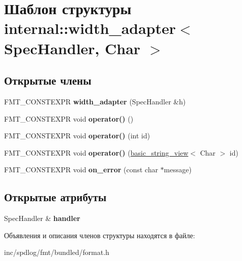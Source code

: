 \hypertarget{structinternal_1_1width__adapter}{}\section{Шаблон структуры internal\+:\+:width\+\_\+adapter$<$ Spec\+Handler, Char $>$}
\label{structinternal_1_1width__adapter}
\subsection*{Открытые члены}
\begin{DoxyCompactItemize}
\item 
\mbox{\label{structinternal_1_1width__adapter_affad3de03545cec8aafc5f21f0f3c893}} 
F\+M\+T\+\_\+\+C\+O\+N\+S\+T\+E\+X\+PR {\bfseries width\+\_\+adapter} (Spec\+Handler \&h)
\item 
\mbox{\label{structinternal_1_1width__adapter_ac2a2429eeed8b2839a59b9f4976a75e7}} 
F\+M\+T\+\_\+\+C\+O\+N\+S\+T\+E\+X\+PR void {\bfseries operator()} ()
\item 
\mbox{\label{structinternal_1_1width__adapter_a74c6e7984bfbd870382b52c2b34c24a6}} 
F\+M\+T\+\_\+\+C\+O\+N\+S\+T\+E\+X\+PR void {\bfseries operator()} (int id)
\item 
\mbox{\label{structinternal_1_1width__adapter_af45e17b7c094f2fb2f072ba3d6a50d2c}} 
F\+M\+T\+\_\+\+C\+O\+N\+S\+T\+E\+X\+PR void {\bfseries operator()} (\hyperlink{classbasic__string__view}{basic\+\_\+string\+\_\+view}$<$ Char $>$ id)
\item 
\mbox{\label{structinternal_1_1width__adapter_a93f45903aeec44f631fb6748a477a2c7}} 
F\+M\+T\+\_\+\+C\+O\+N\+S\+T\+E\+X\+PR void {\bfseries on\+\_\+error} (const char $\ast$message)
\end{DoxyCompactItemize}
\subsection*{Открытые атрибуты}
\begin{DoxyCompactItemize}
\item 
\mbox{\label{structinternal_1_1width__adapter_a59aef299a378b11fca5f9f46ebfd63b2}} 
Spec\+Handler \& {\bfseries handler}
\end{DoxyCompactItemize}


Объявления и описания членов структуры находятся в файле\+:\begin{DoxyCompactItemize}
\item 
inc/spdlog/fmt/bundled/format.\+h\end{DoxyCompactItemize}
